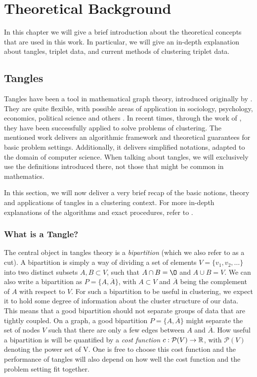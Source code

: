 \chapter{Theoretical Background}\label{theory}
In this chapter we will give a brief introduction about the theoretical concepts that are used in this work. 
In particular, we will give an in-depth explanation about tangles, triplet data, and current methods of clustering triplet data.

\section{Tangles}\label{theory:tangles}
Tangles have been a tool in mathematical graph theory, introduced originally by \cite{robertsonGraphMinorsObstructions1991}. 
They are quite flexible, with possible areas of application in sociology, psychology, economics, political science and others \citep{diestelTanglesSocialSciences2019}.
In recent times, through the work of \cite{klepperClusteringTanglesAlgorithmic2021}, they have been successfully applied
to solve problems of clustering. The mentioned work delivers an algorithmic framework and theoretical guarantees for basic problem settings.
Additionally, it delivers simplified notations, adapted to the domain of computer science. When talking about tangles,
we will exclusively use the definitions introduced there, not those that might be common in mathematics. 

In this section, we will now deliver a very brief recap of the basic notions, theory and applications of tangles in a clustering context.
For more in-depth explanations of the algorithms and exact procedures, refer to \cite{klepperClusteringTanglesAlgorithmic2021}.


\subsection{What is a Tangle?}
The central object in tangles theory is a \textit{bipartition} (which we also refer to as a cut). 
A bipartition is simply a way of dividing a set of elements $V =  \{ v_1, v_2, \ldots \}$ into two distinct subsets $A, B \subset V$, such that
$A \cap B = \O$ and $A \cup B = V$. We can also write a bipartition as $P = \{A, \overline{A}\}$, with $A \subset V$ and $\overline{A}$ being the
complement of $A$ with respect to $V$. For such a bipartition to be useful in clustering, we expect it to hold some degree of information about the cluster 
structure of our data. This means that a good bipartition should not separate groups of data that are tightly coupled.
On a graph, a good bipartition $P = \{A, \overline{A}\}$ might separate the set of nodes $V$ such that there 
are only a few edges between $A$ and $\overline{A}$. How useful a bipartition is will be quantified by a \textit{cost function} $c: \mathcal{P}(V) \to \mathbb{R}$, 
with $\mathcal{P}(V)$ denoting the power set of V. One is free to choose this cost function and the performance of tangles will also depend on
how well the cost function and the problem setting fit together. 

